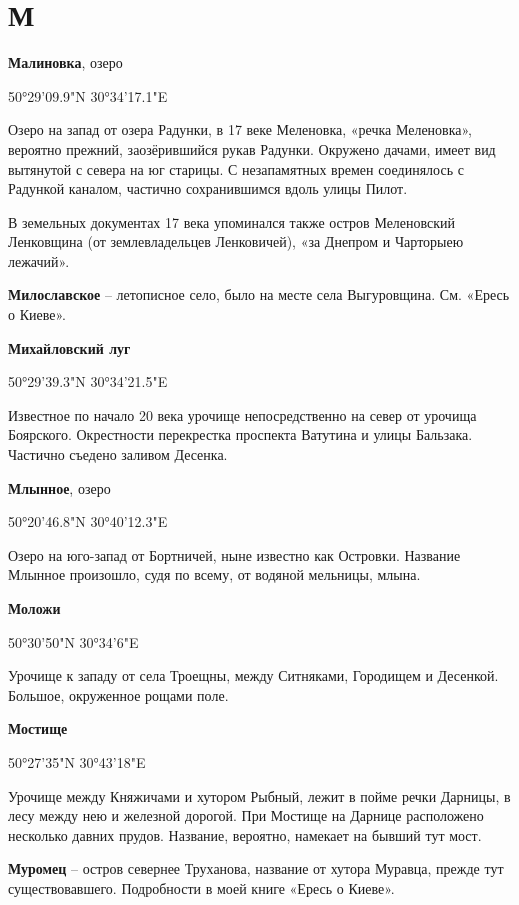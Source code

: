 \chapter*{М}

\textbf{Малиновка}, озеро 

50°29'09.9"N 30°34'17.1"E

Озеро на запад от озера Радунки, в 17 веке  Меленовка, «речка Меленовка», вероятно прежний, заозёрившийся рукав Радунки. Окружено дачами, имеет вид вытянутой с севера на юг старицы. С незапамятных времен соединялось с Радункой каналом, частично сохранившимся вдоль улицы Пилот.

В земельных документах 17 века упоминался также остров Меленовский Ленковщина (от землевладельцев Ленковичей), «за Днепром и Чарторыею лежачий».\\

\medskip


\textbf{Милославское} – летописное село, было на месте села Выгуровщина. См. «Ересь о Киеве».\\

\medskip


\textbf{Михайловский луг} 

50°29'39.3"N 30°34'21.5"E

Известное по начало 20 века урочище непосредственно на север от урочища Боярского. Окрестности перекрестка проспекта Ватутина и улицы Бальзака. Частично съедено заливом Десенка.\\

\medskip


\textbf{Млынное}, озеро

50°20'46.8"N 30°40'12.3"E

Озеро на юго-запад от Бортничей, ныне известно как Островки. Название Млынное произошло, судя по всему, от водяной мельницы, млына.\\

\medskip


\textbf{Моложи} 

50°30'50"N 30°34'6"E

Урочище к западу от села Троещны, между Ситняками, Городищем и Десенкой. Большое, окруженное рощами поле.\\

\medskip


\textbf{Мостище}

50°27'35"N 30°43'18"E

Урочище между Княжичами и хутором Рыбный, лежит в пойме речки Дарницы, в лесу между нею и железной дорогой. При Мостище на Дарнице расположено несколько давних прудов. Название, вероятно, намекает на бывший тут мост.\\

\medskip


\textbf{Муромец} – остров севернее Труханова, название от хутора Муравца, прежде тут существовавшего. Подробности в моей книге «Ересь о Киеве».
